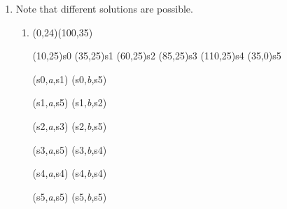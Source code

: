 \documentclass[11pt]{article}
\begin{document}

  \begin{enumerate}

    \item Note that different solutions are possible.

          \vspace{-3mm}

          \begin{enumerate}

          \addtolength{\itemsep}{20mm}

          \item \begin{automaton}(0,24)(100,35)

                  \state[start](10,25){s0}
                  \state(35,25){s1}
                  \state(60,25){s2}
                  \state(85,25){s3}
                  \state[final](110,25){s4}
                  \state[label={\renewcommand{\arraystretch}{.75}%
                                \normalsize%
                                \begin{tabular}[t]{c}%
                                  dead%
                                    \\%
                                  state%
                                \end{tabular}}%
                         ](35,0){s5}%

                  \transition(s0,\emph{a},s1)
                  \transition(s0,\emph{b},s5)

                  \transition[labellocation=below](s1,\emph{a},s5)
                  \transition(s1,\emph{b},s2)

                  \transition(s2,\emph{a},s3)
                  \transition[labellocation=below](s2,\emph{b},s5)

                  \transition[offsetto=-1mm](s3,\emph{a},s5)
                  \transition(s3,\emph{b},s4)

                  \transition(s4,\emph{a},s4)
                  \transition[loopdirection=down](s4,\emph{b},s4)

                  \transition[loopdirection=left](s5,\emph{a},s5)
                  \transition[loopdirection=right](s5,\emph{b},s5)

                \end{automaton}

                \vspace{-1mm}


\end{enumerate}
\end{enumerate}
\end{document}
